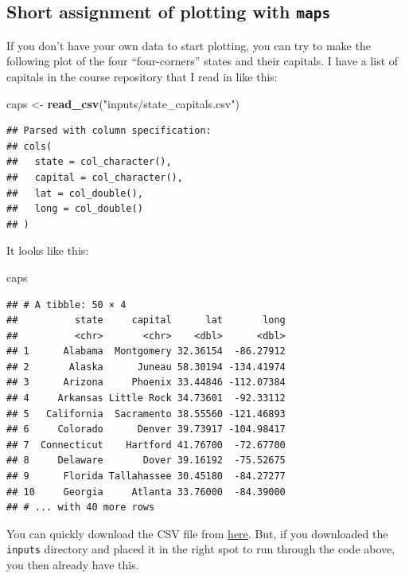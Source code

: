 \documentclass[]{book}
\newenvironment{Shaded}{\begin{snugshade}}{\end{snugshade}}
\newcommand{\KeywordTok}[1]{\textcolor[rgb]{0.13,0.29,0.53}{\textbf{{#1}}}}
\newcommand{\StringTok}[1]{\textcolor[rgb]{0.31,0.60,0.02}{{#1}}}
\newcommand{\NormalTok}[1]{{#1}}
\theoremstyle{definition}
\theoremstyle{definition}
\theoremstyle{remark}
\begin{document}
\subsection{\texorpdfstring{Short assignment of plotting with
\texttt{maps}}{Short assignment of plotting with maps}}\label{short-assignment-of-plotting-with-maps}

If you don't have your own data to start plotting, you can try to make
the following plot of the four ``four-corners'' states and their
capitals. I have a list of capitals in the course repository that I read
in like this:

\begin{Shaded}
\begin{Highlighting}[]
\NormalTok{caps <-}\StringTok{ }\KeywordTok{read_csv}\NormalTok{(}\StringTok{"inputs/state_capitals.csv"}\NormalTok{)}
\end{Highlighting}
\end{Shaded}

\begin{verbatim}
## Parsed with column specification:
## cols(
##   state = col_character(),
##   capital = col_character(),
##   lat = col_double(),
##   long = col_double()
## )
\end{verbatim}

It looks like this:

\begin{Shaded}
\begin{Highlighting}[]
\NormalTok{caps}
\end{Highlighting}
\end{Shaded}

\begin{verbatim}
## # A tibble: 50 × 4
##          state     capital      lat       long
##          <chr>       <chr>    <dbl>      <dbl>
## 1      Alabama  Montgomery 32.36154  -86.27912
## 2       Alaska      Juneau 58.30194 -134.41974
## 3      Arizona     Phoenix 33.44846 -112.07384
## 4     Arkansas Little Rock 34.73601  -92.33112
## 5   California  Sacramento 38.55560 -121.46893
## 6     Colorado      Denver 39.73917 -104.98417
## 7  Connecticut    Hartford 41.76700  -72.67700
## 8     Delaware       Dover 39.16192  -75.52675
## 9      Florida Tallahassee 30.45180  -84.27277
## 10     Georgia     Atlanta 33.76000  -84.39000
## # ... with 40 more rows
\end{verbatim}

You can quickly download the CSV file from
\href{https://www.dropbox.com/s/d3gehuzl4pdkntj/state_capitals.csv?dl=1}{here}.
But, if you downloaded the \texttt{inputs} directory and placed it in
the right spot to run through the code above, you then already have
this.
\end{document}
